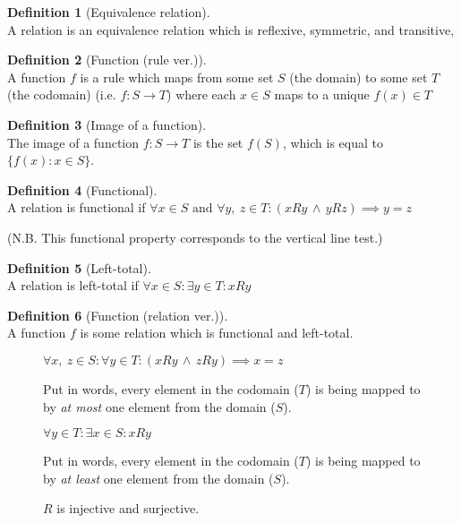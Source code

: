 \documentclass{article}
\theoremstyle{plain}
\numberwithin{theorem}{section}
\theoremstyle{definition}
\newtheorem{definition}{Definition}[section]
\numberwithin{definition}{section}
\begin{document}
\begin{adjustwidth}{-10pt}{-10pt}
\begin{multicols}{2}
\begin{definition}[Equivalence relation]\ \\
    A relation is an equivalence relation which is
    reflexive, symmetric, and transitive,
\end{definition}
\begin{definition}[Function (rule ver.)]\ \\
    A function $f$ is a rule which maps
    from some set $S$ (the domain)
    to some set $T$ (the codomain)
    (i.e. $ f: S \to T$) where each $x \in S$ maps to a unique $f(x) \in T$
\end{definition}
\begin{definition}[Image of a function]\ \\
    The image of a function $f: S \to T$ is the set $f(S)$,
    which is equal to $\{f(x):x \in S\}$.
\end{definition}
\begin{definition}[Functional]\ \\
    A relation is functional if
    $\forall x \in S \text{ and } \forall y,\: z \in T
        : (xRy \, \land \, yRz) \implies y=z$

    (N.B. This functional property corresponds to the vertical line test.)
\end{definition}
\begin{definition}[Left-total]\ \\
    A relation is left-total if
    $\forall x \in S : \exists y \in T : xRy$
\end{definition}
\begin{definition}[Function (relation ver.)]\ \\
    A function $f$ is some relation which is functional and left-total.
\end{definition}
\end{multicols}
\end{adjustwidth}
%
\begin{figure}[H]
\begin{mdframed}[style=exampledefault,frametitle={Function properties}]
\begin{description}[style=sameline]
	\item[Injective (one-to-one)]
		$\forall x,\: z \in S : \forall y \in T
		: (xRy \,\land\, zRy) \implies x = z$

		Put in words, every element in the codomain ($T$)
		is being mapped to by \textit{at most} one element from the domain ($S$).
	\item[Surjective (onto)]
		$\forall y \in T : \exists x \in S : xRy$

		Put in words, every element in the codomain ($T$)
		is being mapped to by \textit{at least} one element from the domain ($S$).
	\item[Bijective]
		$R$ is injective and surjective.
\end{description}
\end{mdframed}
\end{figure}
\end{document}
